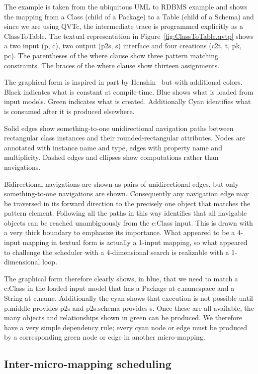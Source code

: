 \documentclass{llncs}
\begin{document}
The example is taken from the ubiquitous UML to RDBMS example and shows the mapping from a Class (child of a Package) to a Table (child of a Schema) and since we are using QVTc, the intermediate trace is programmed explicitly as a ClassToTable. The textual representation in  Figure~\ref{fig:ClassToTable.qvtp} shows a two input (p, c), two output (p2s,  s) interface and four creations (c2t, t, pk, pc). The parentheses of the where clause show three pattern matching constraints. The braces of the where clause show thirteen assignments.

The graphical form is inspired in part by Henshin~\cite{Henshin} but with additional colors. Black indicates what is constant at compile-time. Blue shows what is loaded from input models. Green indicates what is created. Additionally Cyan identifies what is consumed after it is produced elsewhere.

Solid edges show something-to-one unidirectional navigation paths between rectangular class instances and their rounded-rectangular attributes. Nodes are annotated with instance name and type, edges with property name and multiplicity. Dashed edges and ellipses show computations rather than navigations.

Bidirectional navigations are shown as pairs of unidirectional edges, but only something-to-one navigations are shown. Consequently any navigation edge may be traversed in its forward direction to the precisely one object that matches the pattern element. Following all the paths in this way identifies that all navigable objects can be reached unambiguously from the c:Class input. This is drawn with a very thick boundary to emphasize its importance. What appeared to be a 4-input mapping in textual form is actually a 1-input mapping, so what appeared to challenge the scheduler with a 4-dimensional search is realizable with a 1-dimensional loop.

The graphical form therefore clearly shows, in blue, that we need to match a c:Class in the loaded input model that has a Package at c.namespace and a String at c.name. Additionally the cyan shows that execution is not possible until p.middle provides p2s and p2s.schema provides s. Once these are all available, the many objects and relationships shown in green can be produced. We therefore have a very simple dependency rule; every cyan node or edge must be produced by a corresponding green node or edge in another micro-mapping.

\subsection{Inter-micro-mapping scheduling}
\end{document}
